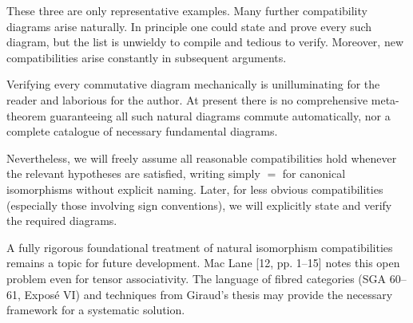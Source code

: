 These three are only representative examples. Many further compatibility diagrams arise naturally. In principle one could state and prove every such diagram, but the list is unwieldy to compile and tedious to verify. Moreover, new compatibilities arise constantly in subsequent arguments.

\setcounter{page}{118}
Verifying every commutative diagram mechanically is unilluminating for the reader and laborious for the author. At present there is no comprehensive meta-theorem guaranteeing all such natural diagrams commute automatically, nor a complete catalogue of necessary fundamental diagrams.

Nevertheless, we will freely assume all reasonable compatibilities hold whenever the relevant hypotheses are satisfied, writing simply \(=\) for canonical isomorphisms without explicit naming. Later, for less obvious compatibilities (especially those involving sign conventions), we will explicitly state and verify the required diagrams.

\setcounter{page}{119}
A fully rigorous foundational treatment of natural isomorphism compatibilities remains a topic for future development. Mac Lane [12, pp. 1–15] notes this open problem even for tensor associativity. The language of fibred categories (SGA 60–61, Exposé VI) and techniques from Giraud’s thesis may provide the necessary framework for a systematic solution.